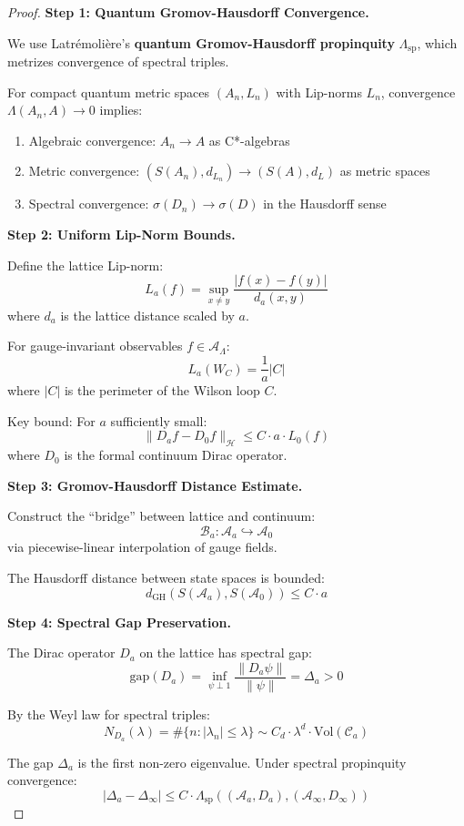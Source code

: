\begin{proof}
\textbf{Step 1: Quantum Gromov-Hausdorff Convergence.}

We use Latrémolière's \textbf{quantum Gromov-Hausdorff propinquity} 
$\Lambda_{\text{sp}}$, which metrizes convergence of spectral triples.

For compact quantum metric spaces $(A_n, L_n)$ with Lip-norms $L_n$, 
convergence $\Lambda(A_n, A) \to 0$ implies:
\begin{enumerate}[label=(\alph*)]
\item Algebraic convergence: $A_n \to A$ as C*-algebras
\item Metric convergence: $(S(A_n), d_{L_n}) \to (S(A), d_L)$ as metric spaces
\item Spectral convergence: $\sigma(D_n) \to \sigma(D)$ in the Hausdorff sense
\end{enumerate}

\textbf{Step 2: Uniform Lip-Norm Bounds.}

Define the lattice Lip-norm:
\[
L_a(f) = \sup_{x \neq y} \frac{|f(x) - f(y)|}{d_a(x,y)}
\]
where $d_a$ is the lattice distance scaled by $a$.

For gauge-invariant observables $f \in \mathcal{A}_\Lambda$:
\[
L_a(W_C) = \frac{1}{a} |C|
\]
where $|C|$ is the perimeter of the Wilson loop $C$.

Key bound: For $a$ sufficiently small:
\[
\|D_a f - D_0 f\|_{\mathcal{H}} \leq C \cdot a \cdot L_0(f)
\]
where $D_0$ is the formal continuum Dirac operator.

\textbf{Step 3: Gromov-Hausdorff Distance Estimate.}

Construct the ``bridge'' between lattice and continuum:
\[
\mathcal{B}_a : \mathcal{A}_a \hookrightarrow \mathcal{A}_0
\]
via piecewise-linear interpolation of gauge fields.

The Hausdorff distance between state spaces is bounded:
\[
d_{\text{GH}}(S(\mathcal{A}_a), S(\mathcal{A}_0)) \leq C \cdot a
\]

\textbf{Step 4: Spectral Gap Preservation.}

The Dirac operator $D_a$ on the lattice has spectral gap:
\[
\text{gap}(D_a) = \inf_{\psi \perp 1} \frac{\|D_a \psi\|}{\|\psi\|} = \Delta_a > 0
\]

By the Weyl law for spectral triples:
\[
N_{D_a}(\lambda) = \#\{n : |\lambda_n| \leq \lambda\} \sim C_d \cdot \lambda^d \cdot \text{Vol}(\mathcal{C}_a)
\]

The gap $\Delta_a$ is the first non-zero eigenvalue. Under spectral 
propinquity convergence:
\[
|\Delta_a - \Delta_\infty| \leq C \cdot \Lambda_{\text{sp}}((\mathcal{A}_a, D_a), (\mathcal{A}_\infty, D_\infty))
\]


\end{proof}
